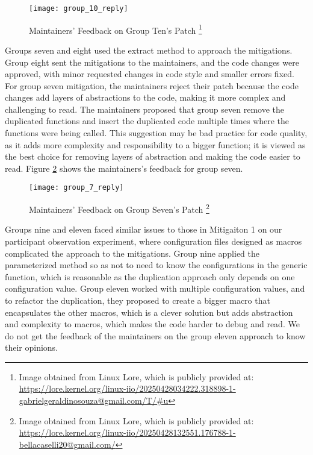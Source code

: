 \begin{figure}
\texttt{[image: group\_10\_reply]}
\caption[Maintainers' Feedback on Group Ten's Patch]{
Maintainers' Feedback on Group Ten's Patch
\footnote{Image obtained from Linux Lore, which is publicly provided at:
\url{https://lore.kernel.org/linux-iio/20250428034222.318898-1-gabrielgeraldinosouza@gmail.com/T/\#u}}
}
\label{fig:group_10_reply}
\end{figure}

Groups seven and eight used the extract method to approach the mitigations. Group eight sent the 
mitigations to the maintainers, and the code changes were approved, with minor requested changes 
in code style and smaller errors fixed. For group seven mitigation, the maintainers reject their 
patch because the code changes add layers of abstractions to the code, making it more complex and 
challenging to read. The maintainers proposed that group seven remove the duplicated functions and 
insert the duplicated code multiple times where the functions were being called. This suggestion 
may be bad practice for code quality, as it adds more complexity and responsibility to a bigger 
function; it is viewed as the best choice for removing layers of abstraction and making the 
code easier to read. Figure \ref{fig:group_7_reply} shows the maintainers's feedback for group seven.


\begin{figure}
\texttt{[image: group\_7\_reply]}
\caption[Maintainers' Feedback on Group Seven's Patch]{
Maintainers' Feedback on Group Seven's Patch
\footnote{Image obtained from Linux Lore, which is publicly provided at:
\url{https://lore.kernel.org/linux-iio/20250428132551.176788-1-bellacaselli20@gmail.com/}}
}
\label{fig:group_7_reply}
\end{figure}

Groups nine and eleven faced similar issues to those in Mitigaiton 1 on our participant observation 
experiment, where configuration files designed as macros complicated the approach to the mitigations. 
Group nine applied the parameterized method so as not to need to know the configurations in the 
generic function, which is reasonable as the duplication approach only depends on one configuration 
value. Group eleven worked with multiple configuration values, and to refactor the duplication, 
they proposed to create a bigger macro that encapsulates the other macros, which is a clever 
solution but adds abstraction and complexity to macros, which makes the code harder to debug and read.
We do not get the feedback of the maintainers on the group eleven approach to know their opinions.

